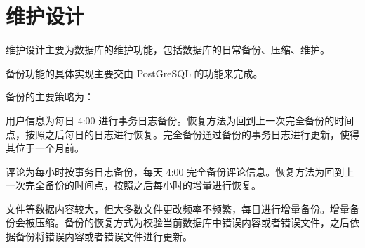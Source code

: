 \chapter{维护设计}

维护设计主要为数据库的维护功能，包括数据库的日常备份、压缩、维护。

备份功能的具体实现主要交由 PostGreSQL 的功能来完成。

备份的主要策略为：

用户信息为每日 4:00 进行事务日志备份。恢复方法为回到上一次完全备份的时间点，按照之后每日的日志进行恢复。完全备份通过备份的事务日志进行更新，使得其位于一个月前。

评论为每小时按事务日志备份，每天 4:00 完全备份评论信息。恢复方法为回到上一次完全备份的时间点，按照之后每小时的增量进行恢复。

文件等数据内容较大，但大多数文件更改频率不频繁，每日进行增量备份。增量备份会被压缩。备份的恢复方式为校验当前数据库中错误内容或者错误文件，之后依据备份将错误内容或者错误文件进行更新。